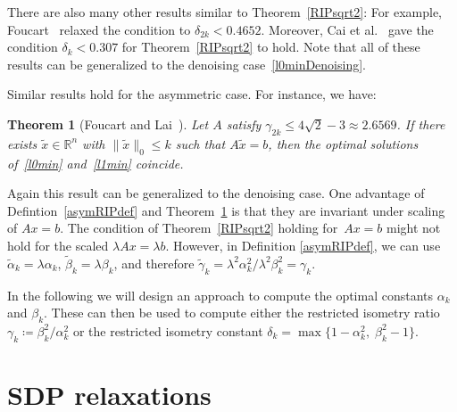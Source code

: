 \documentclass[a4paper,11pt,1p]{elsarticle}
\newtheorem{thm}{Theorem}
\newcommand{\define}{\coloneqq}
\newcommand{\Norm}[2]{\lVert{#1}\rVert_{#2}}
\newcommand{\R}{\mathds{R}}
\begin{document}
There are also many other results similar to Theorem~\ref{RIPsqrt2}: For
example, Foucart~\cite{fou10} relaxed the condition to $\delta_{2k} <
0.4652$. Moreover, Cai et al.~\cite{CWX10} gave the condition $\delta_k <
0.307$ for Theorem~\ref{RIPsqrt2} to hold. Note that all of these results
can be generalized to the denoising case~\eqref{l0minDenoising}.

Similar results hold for the asymmetric case. For instance, we have:

\begin{thm}[Foucart and Lai~\cite{FL09}]\label{asymRIPtheorem}
  Let $A$ satisfy $\gamma_{2k} \leq 4 \sqrt{2} - 3 \approx 2.6569$. If
  there exists $\tilde{x} \in \R^n$ with $\Norm{\tilde{x}}{0} \leq k$ such
  that $A\tilde{x} = b$, then the optimal solutions of~\eqref{l0min}
  and~\eqref{l1min} coincide.
\end{thm}

Again this result can be generalized to the denoising case. One advantage
of Defintion~\ref{asymRIPdef} and Theorem~\ref{asymRIPtheorem} is that they
are invariant under scaling of $Ax = b$. The condition of
Theorem~\ref{RIPsqrt2} holding for~$A x = b$ might not hold for the scaled
$\lambda Ax = \lambda b$. However, in Definition \ref{asymRIPdef}, we can
use $\tilde{\alpha}_k = \lambda \alpha_k$, $\tilde{\beta}_k = \lambda
\beta_k$, and therefore $\tilde{\gamma}_k = \lambda^2 \alpha_k^2 /
\lambda^2 \beta_k^2 = \gamma_k$.

In the following we will design an approach to compute the optimal
constants $\alpha_k$ and $\beta_k$. These can then be used to compute
either the restricted isometry ratio $\gamma_k \define \beta_k^2 / \alpha_k^2$
or the restricted isometry constant $\delta_k = \max \{ 1 - \alpha_k^2,\;
\beta_k^2 - 1 \}$.

\section{SDP relaxations}
\label{sec:SDPrelax}
\end{document}
